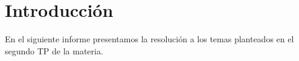 \section{Introducci\'on}

En el siguiente informe presentamos la resoluci\'on a los temas planteados en el segundo TP de la materia. 